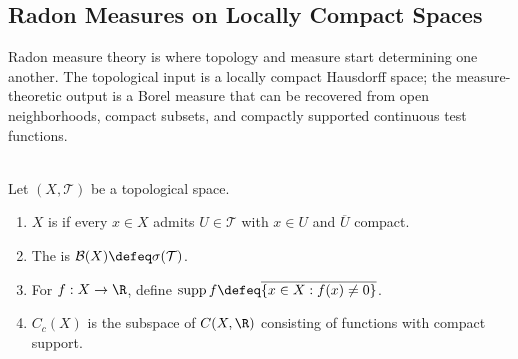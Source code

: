 \subsection{Radon Measures on Locally Compact Spaces}

Radon measure theory is where topology and measure start determining one another. The topological input is a locally compact Hausdorff space; the measure-theoretic output is a Borel measure that can be recovered from open neighborhoods, compact subsets, and compactly supported continuous test functions.

\begin{definition} \label{def:locally-compact-borel-cc-radon-setup} \\
Let $(X,\mathcal{T})$ be a topological space.
\begin{enumerate}[label=(\roman*)]
\setlength{\itemsep}{0pt}
\item $X$ is  if every $x\in X$ admits $U\in\mathcal{T}$ with $x\in U$ and $\overline{U}$ compact.
\item The  is $\mathcal{B}(X)\defeq\sigma(\mathcal{T})$.
\item For $f:X\to\R$, define $\operatorname{supp}f\defeq\overline{\{x\in X:f(x)\neq0\}}$.
\item $C_c(X)$ is the subspace of $C(X,\R)$ consisting of functions with compact support.
\end{enumerate}
\end{definition}

